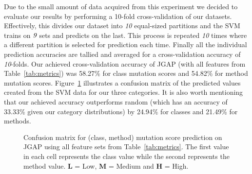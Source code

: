 \documentclass[10pt,conference,compsocconf]{IEEEtran}
\begin{document}
Due to the small amount of data acquired from this experiment we decided to evaluate our results by performing a 10-fold cross-validation of our datasets. Effectively, this divides our dataset into \emph{10} equal-sized partitions and the SVM trains on $\emph{9}$ sets and predicts on the last. This process is repeated \emph{10} times where a different partition is selected for prediction each time. Finally all the individual prediction accuracies are tallied and averaged for a cross-validation accuracy of \emph{10}-folds. Our achieved cross-validation accuracy of JGAP (with all features from Table~\ref{tab:metrics}) was 58.27\% for class mutation scores and 54.82\% for method mutation scores. Figure~\ref{fig:confusion_matrix} illustrates a confusion matrix of the predicted values created from the SVM data for our three categories. It is also worth mentioning that our achieved accuracy outperforms random (which has an accuracy of 33.33\% given our category distributions) by 24.94\% for classes and 21.49\% for methods.

\begin{figure}[!t]
  \small
  \caption{Confusion matrix for (class, method) mutation score prediction on JGAP using all feature sets from Table~\ref{tab:metrics}. The first value in each cell represents the class value while the second represents the method value. \(\mathbf{L}\) = Low, \(\mathbf{M}\) = Medium and \(\mathbf{H}\) = High.}
  \label{fig:confusion_matrix}
\end{figure}
\end{document}
